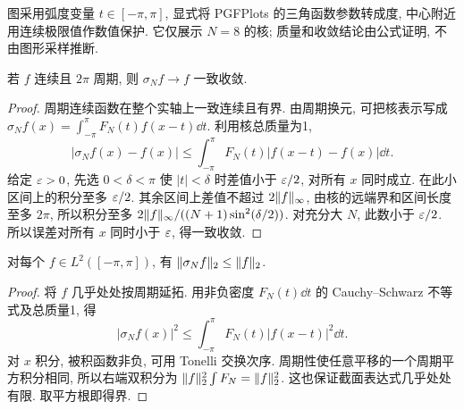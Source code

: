 \begin{center}
\end{center}
图采用弧度变量 $t\in[-\pi,\pi]$, 显式将 PGFPlots 的三角函数参数转成度, 中心附近用连续极限值作数值保护. 它仅展示 $N=8$ 的核; 质量和收敛结论由公式证明, 不由图形采样推断.

\begin{theorem}[Fejér 定理]\label{thm:fejer}
若 $f$ 连续且 $2\pi$ 周期, 则 $\sigma_Nf\to f$ 一致收敛.
\end{theorem}
\begin{proof}
周期连续函数在整个实轴上一致连续且有界. 由周期换元, 可把核表示写成 $\sigma_Nf(x)=\int_{-\pi}^\pi F_N(t)f(x-t)\dd t$. 利用核总质量为1,
\[
|\sigma_Nf(x)-f(x)|
\le\int_{-\pi}^\pi F_N(t)|f(x-t)-f(x)|\dd t.
\]
给定 $\varepsilon>0$, 先选 $0<\delta<\pi$ 使 $|t|<\delta$ 时差值小于 $\varepsilon/2$, 对所有 $x$ 同时成立. 在此小区间上的积分至多 $\varepsilon/2$. 其余区间上差值不超过 $2\lVert f\rVert_\infty$, 由核的远端界和区间长度至多 $2\pi$, 所以积分至多
$2\lVert f\rVert_\infty/((N+1)\sin^2(\delta/2))$. 对充分大 $N$, 此数小于 $\varepsilon/2$. 所以误差对所有 $x$ 同时小于 $\varepsilon$, 得一致收敛.
\end{proof}

\begin{lemma}\label{lem:fejercontraction}
对每个 $f\in L^2([-\pi,\pi])$, 有 $\lVert \sigma_Nf\rVert_2\le\lVert f\rVert_2$.
\end{lemma}
\begin{proof}
将 $f$ 几乎处处按周期延拓. 用非负密度 $F_N(t)\dd t$ 的 Cauchy--Schwarz 不等式及总质量1, 得
\[
|\sigma_Nf(x)|^2\le\int_{-\pi}^\pi F_N(t)|f(x-t)|^2\dd t.
\]
对 $x$ 积分, 被积函数非负, 可用 Tonelli 交换次序. 周期性使任意平移的一个周期平方积分相同, 所以右端双积分为 $\lVert f\rVert_2^2\int F_N=\lVert f\rVert_2^2$. 这也保证截面表达式几乎处处有限. 取平方根即得界.
\end{proof}

